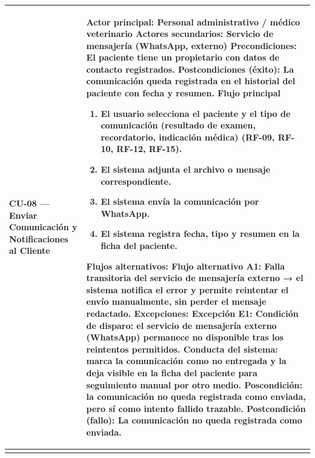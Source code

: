 \documentclass[
]{article}
\newcounter{none} %
\begin{document}
{\def\LTcaptype{none} %
\begin{longtable}[]{|
  >{\raggedright\arraybackslash}p{}|
  >{\raggedright\arraybackslash}p{}|}
\hline
\begin{minipage}[b]{\linewidth}\raggedright
\textbf{CU-08 --- Enviar Comunicación y Notificaciones al Cliente}
\end{minipage} & \begin{minipage}[b]{\linewidth}\raggedright
\textbf{Actor principal:} Personal administrativo / médico veterinario
\textbf{Actores secundarios:} Servicio de mensajería (WhatsApp, externo)
\textbf{Precondiciones:} El paciente tiene un propietario con datos de
contacto registrados. \textbf{Postcondiciones (éxito):} La comunicación queda registrada en el
historial del paciente con fecha y resumen. \textbf{Flujo principal}

\begin{enumerate}
\def\labelenumi{\arabic{enumi}.}
\item
  El usuario selecciona el paciente y el tipo de comunicación (resultado
  de examen, recordatorio, indicación médica) (RF-09, RF-10, RF-12,
  RF-15).
\item
  El sistema adjunta el archivo o mensaje correspondiente.
\item
  El sistema envía la comunicación por WhatsApp.
\item
  El sistema registra fecha, tipo y resumen en la ficha del paciente.
\end{enumerate}

\textbf{Flujos alternativos:} Flujo alternativo A1: Falla transitoria del servicio de mensajería externo → el sistema notifica el error y permite reintentar el envío manualmente, sin perder el mensaje redactado.
\textbf{Excepciones:} Excepción E1: Condición de disparo: el servicio de mensajería externo (WhatsApp) permanece no disponible tras los reintentos permitidos. Conducta del sistema: marca la comunicación como no entregada y la deja visible en la ficha del paciente para seguimiento manual por otro medio. Poscondición: la comunicación no queda registrada como enviada, pero sí como intento fallido trazable.
\textbf{Postcondición (fallo):} La comunicación no queda registrada como enviada.
\end{minipage} \\
\hline
\endhead
\hline
\endlastfoot
\end{longtable}
}
\end{document}
